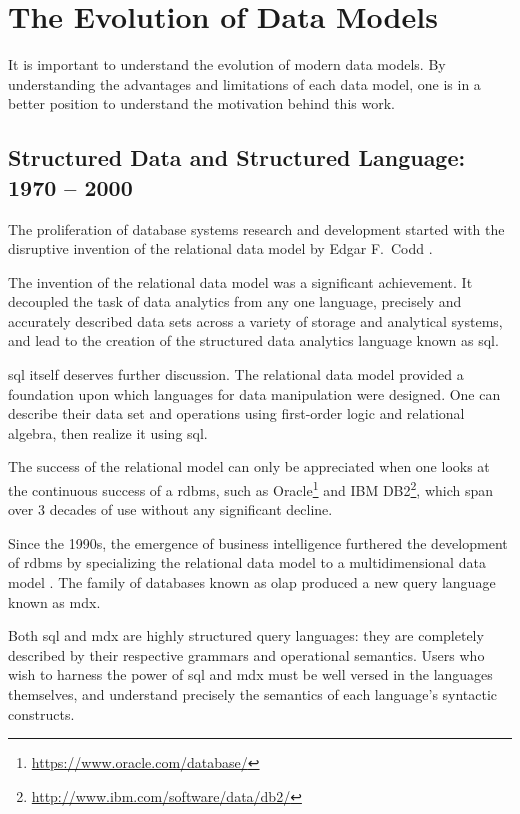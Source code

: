 \section{The Evolution of Data Models}
	It is important to understand the evolution of modern data models.  By understanding the advantages and limitations of each data model, one is in a better position to understand the motivation behind this work.
	
	\subsection{Structured Data and Structured Language:  1970 -- 2000}
		The proliferation of database systems research and development started with the disruptive invention of the relational data model by Edgar F.~Codd \cite{codd-79}.
		
		The invention of the relational data model was a significant achievement.  It decoupled the task of data analytics from any one language, precisely and accurately described data sets across a variety of storage and analytical systems, and lead to the creation of the structured data analytics language known as \acrfull{sql}.
		
		\gls{sql} itself deserves further discussion.  The relational data model provided a foundation upon which languages for data manipulation were designed.  One can describe their data set and operations using first-order logic and relational algebra, then realize it using \gls{sql}.
		
		The success of the relational model can only be appreciated when one looks at the continuous success of a \gls{rdbms}, such as Oracle\footnote{\url{https://www.oracle.com/database/}} and IBM DB2\footnote{\url{http://www.ibm.com/software/data/db2/}}, which span over 3 decades of use without any significant decline.
		
		Since the 1990s, the emergence of business intelligence \cite{bikm-02} furthered the development of \gls{rdbms} by specializing the relational data model to a multidimensional data model \cite{colliat-96}.  The family of databases known as \gls{olap} produced a new query language known as \gls{mdx}.
		
		Both \gls{sql} and \gls{mdx} are highly structured query languages: they are completely described by their respective grammars and operational semantics.  Users who wish to harness the power of \gls{sql} and \gls{mdx} must be well versed in the languages themselves, and understand precisely the semantics of each language's syntactic constructs.
		
